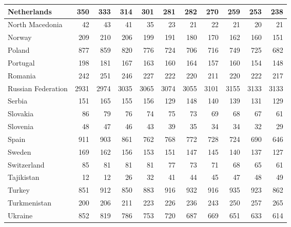 \begin{table}
\begin{tabular}{|l|r|r|r|r|r|r|r|r|r|r|}
                   Netherlands&    350&    333&    314&    301&    281&    282&    270&    259&    253&    238\\\hline
               North Macedonia&     42&     43&     41&     35&     23&     21&     22&     21&     20&     21\\\hline
                        Norway&    209&    210&    206&    199&    191&    180&    170&    162&    160&    151\\\hline
                        Poland&    877&    859&    820&    776&    724&    706&    716&    749&    725&    682\\\hline
                      Portugal&    198&    181&    167&    163&    160&    164&    157&    160&    154&    148\\\hline
                       Romania&    242&    251&    246&    227&    222&    220&    211&    220&    222&    217\\\hline
            Russian Federation&   2931&   2974&   3035&   3065&   3074&   3055&   3101&   3155&   3133&   3133\\\hline
                        Serbia&    151&    165&    155&    156&    129&    148&    140&    139&    131&    129\\\hline
                      Slovakia&     86&     79&     76&     74&     75&     73&     69&     68&     67&     61\\\hline
                      Slovenia&     48&     47&     46&     43&     39&     35&     34&     34&     32&     29\\\hline
                         Spain&    911&    903&    861&    762&    768&    772&    728&    724&    690&    646\\\hline
                        Sweden&    169&    162&    156&    153&    151&    147&    145&    140&    137&    127\\\hline
                   Switzerland&     85&     81&     81&     81&     77&     73&     71&     68&     65&     61\\\hline
                    Tajikistan&     12&     12&     26&     32&     41&     44&     45&     47&     48&     49\\\hline
                        Turkey&    851&    912&    850&    883&    916&    932&    916&    935&    923&    862\\\hline
                  Turkmenistan&    200&    206&    211&    223&    226&    236&    243&    250&    257&    265\\\hline
                       Ukraine&    852&    819&    786&    753&    720&    687&    669&    651&    633&    614\\\hline

\end{tabular}
\end{table}
